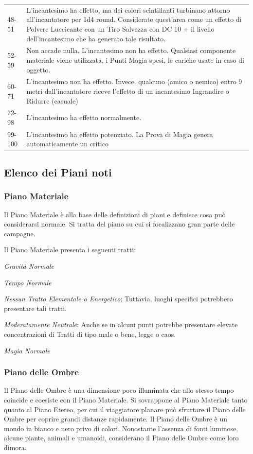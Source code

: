 \documentclass[a4paper,twoside,openany]{book}
\begin{document}
\begin{multicols}{2}
\begin{tabularx}{0.5\textwidth}{lX}
	48-51&L'incantesimo ha effetto, ma dei colori scintillanti turbinano attorno all'incantatore per 1d4 round. Considerate quest'area come un effetto di Polvere Luccicante con un Tiro Salvezza con DC 10 + il livello dell'incantesimo che ha generato tale risultato.\\
	52-59&Non accade nulla. L'incantesimo non ha effetto. Qualsiasi componente materiale viene utilizzata, i Punti Magia spesi, le cariche usate in caso di oggetto.\\
	60-71&L'incantesimo non ha effetto. Invece, qualcuno (amico o nemico) entro 9 metri dall'incantatore riceve l'effetto di un incantesimo Ingrandire o Ridurre (casuale)\\
	72-98&L'incantesimo ha effetto normalmente.\\
	99-100&L'incantesimo ha effetto potenziato. La Prova di Magia genera automaticamente un critico
\end{tabularx}



\subsection{Elenco dei Piani noti}

\subsubsection{Piano Materiale}\label{pianomateriale}
Il Piano Materiale è alla base delle definizioni di piani e definisce cosa può considerarsi normale. Si tratta del piano su cui si focalizzano gran parte delle campagne.

Il Piano Materiale presenta i seguenti tratti:

\noindent\emph{Gravità Normale}

\noindent\emph{Tempo Normale}

\noindent\emph{Nessun Tratto Elementale o Energetico}: Tuttavia, luoghi specifici potrebbero presentare tali tratti.

\noindent\emph{Moderatamente Neutrale}: Anche se in alcuni punti potrebbe presentare elevate concentrazioni di Tratti di tipo male o bene, legge o caos.

\noindent\emph{Magia Normale}

\subsubsection{Piano delle Ombre}\label{pianoombre}
Il Piano delle Ombre è una dimensione poco illuminata che allo stesso tempo coincide e coesiste con il Piano Materiale. Si sovrappone al Piano Materiale tanto quanto al Piano Etereo, per cui il viaggiatore planare può sfruttare il Piano delle Ombre per coprire grandi distanze rapidamente. Il Piano delle Ombre è un mondo in bianco e nero privo di colori. Nonostante l'assenza di fonti luminose, alcune piante, animali e umanoidi, considerano il Piano delle Ombre come loro dimora.


\end{multicols}
\end{document}
